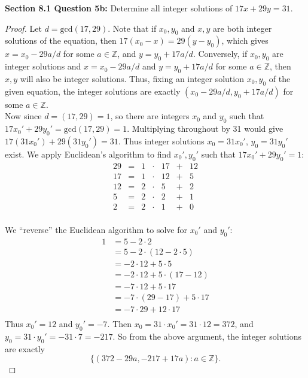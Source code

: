 \documentclass{article}
\begin{document}
\textbf{Section 8.1 Question 5b:} Determine all integer solutions of
  $17x+29y=31$.
  \begin{proof}
    Let $d=\text{gcd}(17,29)$. Note that if $x_0,y_0$ and $x,y$ are
    both integer solutions of the equation, then $17(x_0-x)=29(y-y_0)$,
    which gives $x=x_0-29a/d$ for some $a\in\mathbb{Z}$, and
    $y=y_0+17a/d$. Conversely, if $x_0,y_0$ are integer solutions and
    $x=x_0-29a/d$ and $y=y_0+17a/d$ for some $a\in\mathbb{Z}$, then $x,y$
    will also be integer solutions. Thus, fixing an integer solution
    $x_0,y_0$ of the given equation, the integer solutions are exactly
    $(x_0-29a/d,y_0+17a/d)$ for some $a\in\mathbb{Z}$. \\

    Now since $d=(17,29)=1$, so there are integers $x_0$ and $y_0$
    such that $17x_0'+29y_0'=\text{gcd}(17,29)=1$. Multiplying throughout by
    31 would give $17(31x_0')+29(31y_0')=31$. Thus integer solutions
    $x_0=31x_0'$, $y_0=31y_0'$ exist. We apply Euclidean's algorithm to
    find $x_0',y_0'$ such that $17x_0'+29y_0'=1$:
    \[\begin{array}{rcrcrcr}
      29 &= &1 &\cdot &17 &+ &12 \\
      17 &= &1 &\cdot &12 &+ &5 \\
      12 &= &2 &\cdot &5  &+ &2 \\
       5 &= &2 &\cdot &2  &+ &1 \\
       2 &= &2 &\cdot &1  &+ &0 \\
    \end{array}\]

    We ``reverse'' the Euclidean algorithm to solve for $x_0'$ and $y_0'$:
    \begin{align*}
      1 &=5-2\cdot2 \\
        &=5-2\cdot(12-2\cdot5) \\
        &=-2\cdot12+5\cdot5 \\
        &=-2\cdot12+5\cdot(17-12) \\
        &=-7\cdot12+5\cdot17 \\
        &=-7\cdot(29-17)+5\cdot17 \\
        &=-7\cdot29+12\cdot17 \\
    \end{align*}
    Thus $x_0'=12$ and $y_0'=-7$. Then $x_0=31\cdot x_0'=31\cdot12=372$, and
    $y_0=31\cdot y_0'=-31\cdot7=-217$. So from the above argument, the
    integer solutions are exactly
    \[\{(372-29a,-217+17a):a\in\mathbb{Z}\}.\]
  \end{proof}
\end{document}
